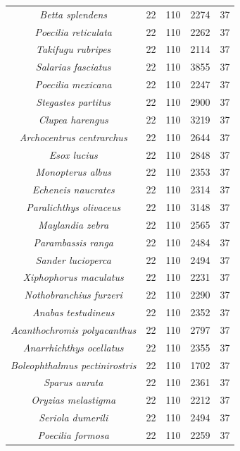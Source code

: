 \begin{longtable}[c]{|c|c|c|c|c|}
\textit{Betta splendens}               & 22  & 110 & 2274 & 37 \\
\textit{Poecilia reticulata}           & 22  & 110 & 2262 & 37 \\
\textit{Takifugu rubripes}             & 22  & 110 & 2114 & 37 \\
\textit{Salarias fasciatus}            & 22  & 110 & 3855 & 37 \\
\textit{Poecilia mexicana}             & 22  & 110 & 2247 & 37 \\
\textit{Stegastes partitus}            & 22  & 110 & 2900 & 37 \\
\textit{Clupea harengus}               & 22  & 110 & 3219 & 37 \\
\textit{Archocentrus centrarchus}      & 22  & 110 & 2644 & 37 \\
\textit{Esox lucius}                   & 22  & 110 & 2848 & 37 \\
\textit{Monopterus albus}              & 22  & 110 & 2353 & 37 \\
\textit{Echeneis naucrates}            & 22  & 110 & 2314 & 37 \\
\textit{Paralichthys olivaceus}        & 22  & 110 & 3148 & 37 \\
\textit{Maylandia zebra}               & 22  & 110 & 2565 & 37 \\
\textit{Parambassis ranga}             & 22  & 110 & 2484 & 37 \\
\textit{Sander lucioperca}             & 22  & 110 & 2494 & 37 \\
\textit{Xiphophorus maculatus}         & 22  & 110 & 2231 & 37 \\
\textit{Nothobranchius furzeri}        & 22  & 110 & 2290 & 37 \\
\textit{Anabas testudineus}            & 22  & 110 & 2352 & 37 \\
\textit{Acanthochromis polyacanthus}   & 22  & 110 & 2797 & 37 \\
\textit{Anarrhichthys ocellatus}       & 22  & 110 & 2355 & 37 \\
\textit{Boleophthalmus pectinirostris} & 22  & 110 & 1702 & 37 \\
\textit{Sparus aurata}                 & 22  & 110 & 2361 & 37 \\
\textit{Oryzias melastigma}            & 22  & 110 & 2212 & 37 \\
\textit{Seriola dumerili}              & 22  & 110 & 2494 & 37 \\
\textit{Poecilia formosa}              & 22  & 110 & 2259 & 37 \\

\end{longtable}
